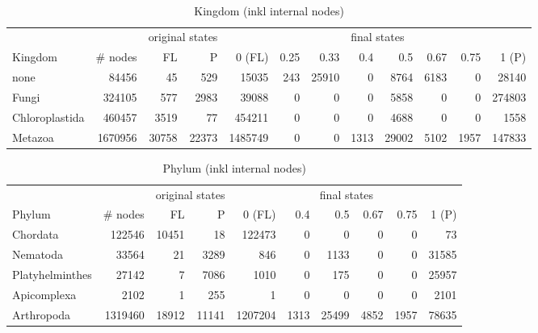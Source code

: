        \\

      \begin{table}
        \begin{center}
          \hspace*{-2cm}\begin{tabular}{ |l|r||r|r||r|r|r|r|r|r|r|r| }
            \hline
            & & \multicolumn{2}{c||}{original states} & \multicolumn{8}{c|}{final states} \\
            Kingdom & \# nodes & FL & P
              & 0 (FL) & 0.25 & 0.33 & 0.4 & 0.5 & 0.67 & 0.75 & 1 (P) \\
            \hline \hline
            none & 84456 & 45 & 529 
              & 15035 & 243 & 25910 & 0 & 8764 & 6183 & 0 & 28140 \\
            Fungi & 324105 & 577 & 2983
              & 39088 & 0 & 0 & 0 & 5858 & 0 & 0 & 274803 \\
            Chloroplastida & 460457 & 3519 & 77
              & 454211 & 0 & 0 & 0 & 4688 & 0 & 0 & 1558 \\
            Metazoa & 1670956 & 30758 & 22373
              & 1485749 & 0 & 0 & 1313 & 29002 & 5102 & 1957 & 147833 \\
            \hline  
          \end{tabular}
        \end{center}
        \caption{Kingdom (inkl internal nodes)}
      \end{table}

      \begin{table}
        \begin{center}
          \begin{tabular}{ |l|r||r|r||r|r|r|r|r|r| }
            \hline
            & & \multicolumn{2}{c||}{original states} & \multicolumn{6}{c|}{final states} \\
            Phylum & \# nodes & FL & P
              & 0 (FL) & 0.4 & 0.5 & 0.67 & 0.75 & 1 (P) \\
            \hline \hline
            Chordata & 122546 & 10451 & 18 
              & 122473 & 0 & 0 & 0 & 0 & 73 \\
            Nematoda & 33564 & 21 & 3289 
              & 846 & 0 & 1133 & 0 & 0 & 31585 \\
            Platyhelminthes & 27142 & 7 & 7086 
              & 1010 & 0 & 175 & 0 & 0 & 25957 \\
            Apicomplexa & 2102 & 1 & 255 
              & 1 & 0 & 0 & 0 & 0 & 2101 \\
            \hline
            Arthropoda & 1319460 & 18912 & 11141 
              & 1207204 & 1313 & 25499 & 4852 & 1957 & 78635 \\
            \hline
          \end{tabular}
        \end{center}
        \caption{Phylum (inkl internal nodes)}
      \end{table}

